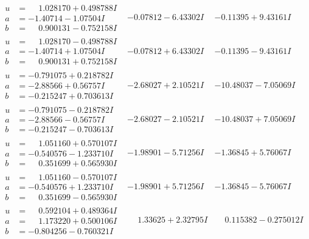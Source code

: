 \documentclass[1p]{elsarticle_modified}
\theoremstyle{definition}
\begin{document}
$$\begin{array}{c|c|c}
\begin{aligned}
u &= \phantom{-}1.028170 + 0.498788 I \\
a &= -1.40714 - 1.07504 I \\
b &= \phantom{-}0.900131 - 0.752158 I\end{aligned}
 & -0.07812 - 6.43302 I & -0.11395 + 9.43161 I \\ \hline\begin{aligned}
u &= \phantom{-}1.028170 - 0.498788 I \\
a &= -1.40714 + 1.07504 I \\
b &= \phantom{-}0.900131 + 0.752158 I\end{aligned}
 & -0.07812 + 6.43302 I & -0.11395 - 9.43161 I \\ \hline\begin{aligned}
u &= -0.791075 + 0.218782 I \\
a &= -2.88566 + 0.56757 I \\
b &= -0.215247 + 0.703613 I\end{aligned}
 & -2.68027 + 2.10521 I & -10.48037 - 7.05069 I \\ \hline\begin{aligned}
u &= -0.791075 - 0.218782 I \\
a &= -2.88566 - 0.56757 I \\
b &= -0.215247 - 0.703613 I\end{aligned}
 & -2.68027 - 2.10521 I & -10.48037 + 7.05069 I \\ \hline\begin{aligned}
u &= \phantom{-}1.051160 + 0.570107 I \\
a &= -0.540576 - 1.233710 I \\
b &= \phantom{-}0.351699 + 0.565930 I\end{aligned}
 & -1.98901 - 5.71256 I & -1.36845 + 5.76067 I \\ \hline\begin{aligned}
u &= \phantom{-}1.051160 - 0.570107 I \\
a &= -0.540576 + 1.233710 I \\
b &= \phantom{-}0.351699 - 0.565930 I\end{aligned}
 & -1.98901 + 5.71256 I & -1.36845 - 5.76067 I \\ \hline\begin{aligned}
u &= \phantom{-}0.592104 + 0.489364 I \\
a &= \phantom{-}1.173220 + 0.500106 I \\
b &= -0.804256 - 0.760321 I\end{aligned}
 & \phantom{-}1.33625 + 2.32795 I & \phantom{-}0.115382 - 0.275012 I \\ \hline\begin{aligned}

\end{aligned}
\end{array}$$
\end{document}
